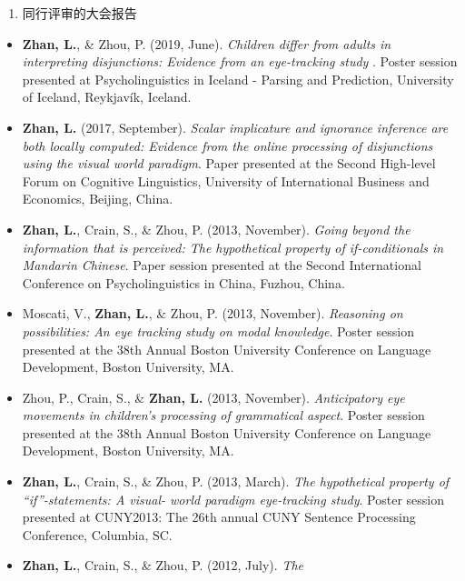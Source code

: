 \documentclass[12pt,]{article}
\providecommand{\tightlist}{%
  \setlength{\itemsep}{0pt}\setlength{\parskip}{0pt}}
\begin{document}
\begin{enumerate}
\def\labelenumi{\arabic{enumi}.}
\setcounter{enumi}{3}
\tightlist
\item
  同行评审的大会报告
\end{enumerate}

\begin{itemize}
\item
  \textbf{Zhan, L.}, \& Zhou, P. (2019, June). \emph{Children differ
  from adults in interpreting disjunctions: Evidence from an
  eye-tracking study }. Poster session presented at Psycholinguistics in
  Iceland - Parsing and Prediction, University of Iceland, Reykjavík,
  Iceland. \href{https://publications.likan.info/Talks/PIPP_Poster.pdf}{
  \faFilePdf[regular] }
\item
  \textbf{Zhan, L.} (2017, September). \emph{Scalar implicature and
  ignorance inference are both locally computed: Evidence from the
  online processing of disjunctions using the visual world paradigm}.
  Paper presented at the Second High-level Forum on Cognitive
  Linguistics, University of International Business and Economics,
  Beijing, China.
  \href{https://publications.likan.info/Talks/ZhanL2017UIBE.pdf}{
  \faFilePdf[regular] }
\item
  \textbf{Zhan, L.}, Crain, S., \& Zhou, P. (2013, November).
  \emph{Going beyond the information that is perceived: The hypothetical
  property of if-conditionals in Mandarin Chinese}. Paper session
  presented at the Second International Conference on Psycholinguistics
  in China, Fuzhou, China.
\item
  Moscati, V., \textbf{Zhan, L.}, \& Zhou, P. (2013, November).
  \emph{Reasoning on possibilities: An eye tracking study on modal
  knowledge}. Poster session presented at the 38th Annual Boston
  University Conference on Language Development, Boston University, MA.
\item
  Zhou, P., Crain, S., \& \textbf{Zhan, L.} (2013, November).
  \emph{Anticipatory eye movements in children's processing of
  grammatical aspect}. Poster session presented at the 38th Annual
  Boston University Conference on Language Development, Boston
  University, MA.
\item
  \textbf{Zhan, L.}, Crain, S., \& Zhou, P. (2013, March). \emph{The
  hypothetical property of ``if''-statements: A visual- world paradigm
  eye-tracking study}. Poster session presented at CUNY2013: The 26th
  annual CUNY Sentence Processing Conference, Columbia, SC.
\item
  \textbf{Zhan, L.}, Crain, S., \& Zhou, P. (2012, July). \emph{The
}
\end{itemize}
\end{document}
